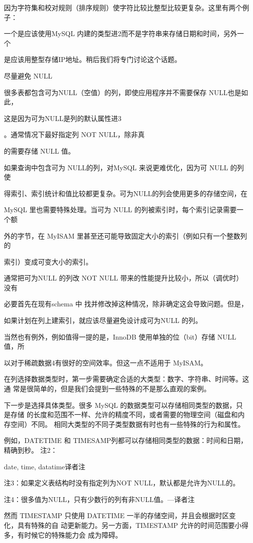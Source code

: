 因为字符集和校对规则（排序规则）使字符比较比整型比较更复杂。这里有两个例子：

一个是应该使用MySQL 内建的类型进2而不是字符串来存储日期和时间，另外一个

是应该用整型存储IP地址。稍后我们将专门讨论这个话题。

尽量避免 NULL

很多表都包含可为NULL（空值）的列，即使应用程序并不需要保存 NULL也是如此，

这是因为可为NULL是列的默认属性进3

。通常情况下最好指定列 NOT NULL，除非真

的需要存储 NULL 值。

如果查询中包含可为 NULL的列，对MySQL 来说更难优化，因为可 NULL 的列使

得索引、索引统计和值比较都更复杂。可为NULL的列会使用更多的存储空间，在

MySQL 里也需要特殊处理。当可为 NULL 的列被索引时，每个索引记录需要一个额

外的字节，在 MyISAM 里甚至还可能导致固定大小的索引（例如只有一个整数列的

索引）变成可变大小的索引。

通常把可为NULL 的列改 NOT NULL 带来的性能提升比较小，所以（调优时）没有

必要首先在现有schema 中 找并修改掉这种情况，除非确定这会导致问题。但是，

如果计划在列上建索引，就应该尽量避免设计成可为NULL 的列。

当然也有例外，例如值得一提的是，InnoDB 使用单独的位（bit）存储 NULL 值，所

以对于稀疏数据4有很好的空间效率。但这一点不适用于 MyISAM。

在列选择数据类型时，第一步需要确定合适的大类型：数字、字符串、时间等。这通
常是很简单的，但是我们会提到一些特殊的不是那么直观的案例。

下一步是选择具体类型。很多 MySQL 的数据类型可以存储相同类型的数据，只是存储
的长度和范围不一样、允许的精度不同，或者需要的物理空间（磁盘和内存空间）不同。
相同大类型的不同子类型数据有时也有一些特殊的行为和属性。

例如，DATETIME 和 TIMESAMP列都可以存储相同类型的数据：时间和日期，精确到秒。
注2：

date, time, datatime译者注

注3：如果定义表结构时没有指定列为NOT NULL，默认都是允许为NULL的。

注4：很多值为NULL，只有少数行的列有非NULL值。—译者注

然而 TIMESTAMP 只使用 DATETIME 一半的存储空间，并且会根据时区变化，具有特殊的自
动更新能力。另一方面，TIMESTAMP 允许的时间范围要小得多，有时候它的特殊能力会
成为障碍。

